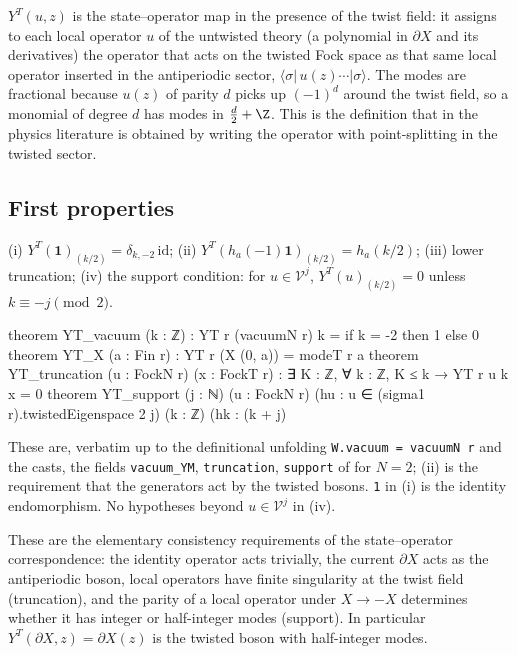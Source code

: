 \begin{physics}
$Y^T(u,z)$ is the state--operator map in the presence of the twist field: it assigns to each local operator $u$ of the untwisted theory (a polynomial in $\partial X$ and its derivatives) the operator that acts on the twisted Fock space as that same local operator inserted in the antiperiodic sector, $\langle\sigma|\,u(z)\cdots|\sigma\rangle$. The modes are fractional because $u(z)$ of parity $d$ picks up $(-1)^d$ around the twist field, so a monomial of degree $d$ has modes in $\tfrac d2+\Z$. This is the definition that in the physics literature is obtained by writing the operator with point-splitting in the twisted sector.
\end{physics}

\subsection{First properties}

\begin{theorem}\label{ch07:thm:YTbasic}
(i) $Y^T(\mathbf 1)_{(k/2)} = \delta_{k,-2}\,\mathrm{id}$; (ii) $Y^T(h_a(-1)\mathbf 1)_{(k/2)} =
h_a(k/2)$; (iii) lower truncation; (iv) the support condition: for $u\in\mathcal V^j$,
$Y^T(u)_{(k/2)} = 0$ unless $k\equiv -j\pmod2$.
\end{theorem}

\begin{leancode}
theorem YT_vacuum (k : ℤ) : YT r (vacuumN r) k = if k = -2 then 1 else 0
theorem YT_X (a : Fin r) : YT r (X (0, a)) = modeT r a
theorem YT_truncation (u : FockN r) (x : FockT r) :
    ∃ K : ℤ, ∀ k : ℤ, K ≤ k → YT r u k x = 0
theorem YT_support (j : ℕ) (u : FockN r) (hu : u ∈ (sigma1 r).twistedEigenspace 2 j)
    (k : ℤ) (hk : (k + j) %
\end{leancode}

\begin{dictionary}
These are, verbatim up to the definitional unfolding \verb|W.vacuum = vacuumN r| and the casts,
the fields \verb|vacuum_YM|, \verb|truncation|, \verb|support| of  for
$N=2$; (ii) is the requirement that the generators act by the twisted bosons. \verb|1| in (i) is
the identity endomorphism. No hypotheses beyond $u\in\mathcal V^j$ in (iv).
\end{dictionary}

\begin{physics}
These are the elementary consistency requirements of the state--operator correspondence: the identity operator acts trivially, the current $\partial X$ acts as the antiperiodic boson, local operators have finite singularity at the twist field (truncation), and the parity of a local operator under $X\to-X$ determines whether it has integer or half-integer modes (support). In particular $Y^T(\partial X,z)=\partial X(z)$ is the twisted boson with half-integer modes.
\end{physics}


